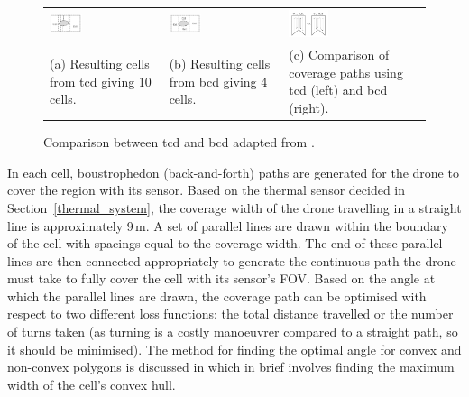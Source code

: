 \begin{figure}[h!]
    \centering
    \begin{tabular}{p{}p{}p{}}
        \includegraphics[width=0.3\textwidth]{figs/Jihwan/choset_tcd.pdf} &
        \includegraphics[width=0.3\textwidth]{figs/Jihwan/choset_bcd.pdf} &
        \includegraphics[width=0.3\textwidth]{figs/Jihwan/choset_bcd_tcd_comparison.pdf} \\
        \centering (a) Resulting cells from \gls{tcd} giving 10 cells. & 
        \centering (b) Resulting cells from \gls{bcd} giving 4 cells. & 
        \centering (c) Comparison of coverage paths using \gls{tcd} (left) and \gls{bcd} (right).
    \end{tabular}
    \caption[Comparison between TCD and BCD]
    {Comparison between \gls{tcd} and \gls{bcd} adapted from \cite{choset1998bcd}.}
    \label{fig:msp_choset}
\end{figure}

In each cell, boustrophedon (back-and-forth) paths are generated for the drone to cover the region with its sensor. Based on the thermal sensor decided in Section~\ref{thermal_system}, the coverage width of the drone travelling in a straight line is approximately 9\,m. A set of parallel lines are drawn within the boundary of the cell with spacings equal to the coverage width. The end of these parallel lines are then connected appropriately to generate the continuous path the drone must take to fully cover the cell with its sensor's \gls{FOV}. Based on the angle at which the parallel lines are drawn, the coverage path can be optimised with respect to two different loss functions: the total distance travelled or the number of turns taken (as turning is a costly manoeuvrer compared to a straight path, so it should be minimised). The method for finding the optimal angle for convex and non-convex polygons is discussed in \cite{torres2016cpp} which in brief involves finding the maximum width of the cell's convex hull. 

